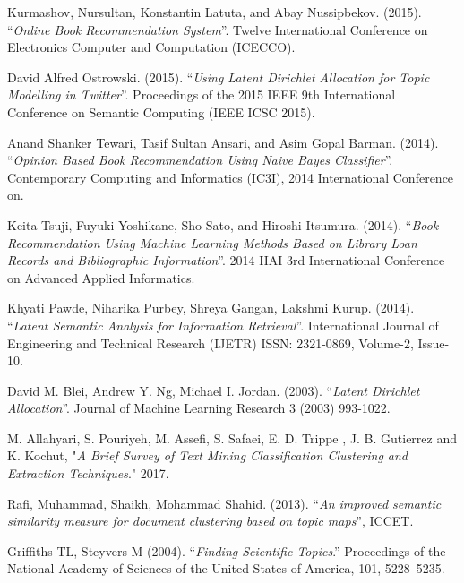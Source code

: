 \begin{thebibliography}{19}
{Kurmashov, Nursultan, Konstantin Latuta, and Abay Nussipbekov. (2015). “\emph{Online Book Recommendation System}”. Twelve International Conference on Electronics Computer and Computation (ICECCO).}

{David Alfred Ostrowski. (2015). “\emph{Using Latent Dirichlet Allocation for Topic Modelling in Twitter}”. Proceedings of the 2015 IEEE 9th International Conference on Semantic Computing (IEEE ICSC 2015).}

{Anand Shanker Tewari, Tasif Sultan Ansari, and Asim Gopal Barman. (2014). “\emph{Opinion Based Book Recommendation Using Naive Bayes Classifier}”. Contemporary Computing and Informatics (IC3I), 2014 International Conference on.}

{Keita Tsuji, Fuyuki Yoshikane, Sho Sato, and Hiroshi Itsumura. (2014). “\emph{Book Recommendation Using Machine Learning Methods Based on Library Loan Records and Bibliographic Information}”. 2014 IIAI 3rd International Conference on Advanced Applied Informatics.}

{Khyati Pawde, Niharika Purbey, Shreya Gangan, Lakshmi Kurup. (2014). “\emph{Latent Semantic Analysis for Information Retrieval}”. International Journal of Engineering and Technical Research (IJETR) ISSN: 2321-0869, Volume-2, Issue-10.}

{David M. Blei, Andrew Y. Ng, Michael I. Jordan. (2003). “\emph{Latent Dirichlet Allocation}”. Journal of Machine Learning Research 3 (2003) 993-1022.}

{M. Allahyari, S. Pouriyeh, M. Assefi, S. Safaei, E. D. Trippe , J. B. Gutierrez and K. Kochut, "\emph{A Brief Survey of Text Mining Classification Clustering and Extraction Techniques}." 2017.}

{Rafi, Muhammad, Shaikh, Mohammad Shahid. (2013). “\emph{An improved semantic similarity measure for document clustering based on topic maps}”, ICCET.}

{Griffiths TL, Steyvers M (2004). “\emph{Finding Scientific Topics}.” Proceedings of the National Academy of Sciences of the United States of America, 101, 5228–5235.}

\end{thebibliography}
































